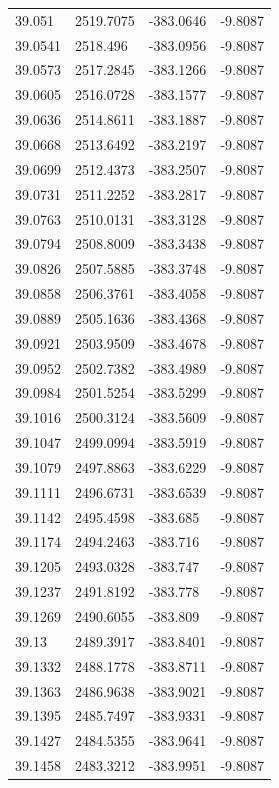 \begin{table}[H]
\begin{tabular}{llll}
39.051 & 2519.7075 & -383.0646 & -9.8087 \\
39.0541 & 2518.496 & -383.0956 & -9.8087 \\
39.0573 & 2517.2845 & -383.1266 & -9.8087 \\
39.0605 & 2516.0728 & -383.1577 & -9.8087 \\
39.0636 & 2514.8611 & -383.1887 & -9.8087 \\
39.0668 & 2513.6492 & -383.2197 & -9.8087 \\
39.0699 & 2512.4373 & -383.2507 & -9.8087 \\
39.0731 & 2511.2252 & -383.2817 & -9.8087 \\
39.0763 & 2510.0131 & -383.3128 & -9.8087 \\
39.0794 & 2508.8009 & -383.3438 & -9.8087 \\
39.0826 & 2507.5885 & -383.3748 & -9.8087 \\
39.0858 & 2506.3761 & -383.4058 & -9.8087 \\
39.0889 & 2505.1636 & -383.4368 & -9.8087 \\
39.0921 & 2503.9509 & -383.4678 & -9.8087 \\
39.0952 & 2502.7382 & -383.4989 & -9.8087 \\
39.0984 & 2501.5254 & -383.5299 & -9.8087 \\
39.1016 & 2500.3124 & -383.5609 & -9.8087 \\
39.1047 & 2499.0994 & -383.5919 & -9.8087 \\
39.1079 & 2497.8863 & -383.6229 & -9.8087 \\
39.1111 & 2496.6731 & -383.6539 & -9.8087 \\
39.1142 & 2495.4598 & -383.685 & -9.8087 \\
39.1174 & 2494.2463 & -383.716 & -9.8087 \\
39.1205 & 2493.0328 & -383.747 & -9.8087 \\
39.1237 & 2491.8192 & -383.778 & -9.8087 \\
39.1269 & 2490.6055 & -383.809 & -9.8087 \\
39.13 & 2489.3917 & -383.8401 & -9.8087 \\
39.1332 & 2488.1778 & -383.8711 & -9.8087 \\
39.1363 & 2486.9638 & -383.9021 & -9.8087 \\
39.1395 & 2485.7497 & -383.9331 & -9.8087 \\
39.1427 & 2484.5355 & -383.9641 & -9.8087 \\
39.1458 & 2483.3212 & -383.9951 & -9.8087 \\

\end{tabular}
\end{table}
